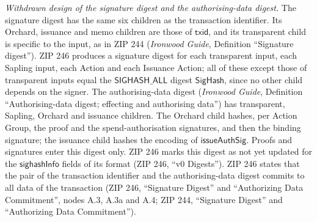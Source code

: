 \documentclass[11pt,a4paper]{article}
\theoremstyle{definition}
\begin{document}
\emph{Withdrawn design of the signature digest and the authorising-data
digest.} The signature digest has the same six children as the transaction
identifier. Its Orchard, issuance and memo children are those of
$\mathsf{txid}$, and its transparent child is specific to the input, as in
ZIP 244 (\emph{Ironwood Guide}, Definition ``Signature digest''). ZIP 246
produces a signature digest for each transparent input, each Sapling input,
each Action and each Issuance Action; all of these except those of
transparent inputs equal the $\mathsf{SIGHASH\_ALL}$ digest
$\mathsf{SigHash}$, since no other child depends on the signer. The
authorising-data digest (\emph{Ironwood Guide}, Definition
``Authorising-data digest; effecting and authorising data'') has
transparent, Sapling, Orchard and issuance children. The Orchard child
hashes, per Action Group, the proof and the spend-authorisation
signatures, and then the binding signature; the issuance child hashes the
encoding of $\mathsf{issueAuthSig}$. Proofs and signatures enter this
digest only. ZIP 246 marks this digest as not yet updated for the
$\mathsf{sighashInfo}$ fields of its format (ZIP 246, ``v0 Digests''). ZIP 246
states that the pair of the transaction identifier
and the authorising-data digest commits to all data of the transaction
(ZIP 246, ``Signature Digest'' and ``Authorizing Data Commitment'', nodes
A.3, A.3a and A.4; ZIP 244, ``Signature Digest'' and ``Authorizing Data
Commitment'').
\end{document}
